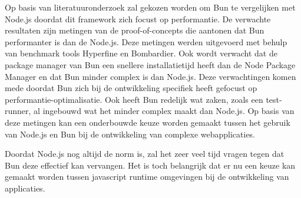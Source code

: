 Op basis van literatuuronderzoek zal gekozen worden om Bun te vergelijken met Node.js doordat dit framework zich focust op performantie.
De verwachte resultaten zijn metingen van de proof-of-concepts die aantonen dat Bun performanter is dan de Node.js. 
Deze metingen werden uitgevoerd met behulp van benchmark tools Hyperfine en Bombardier.
Ook wordt verwacht dat de package manager van Bun een snellere installatietijd heeft dan de Node Package Manager en dat Bun minder complex is dan Node.js.
Deze verwachtingen komen mede doordat Bun zich bij de ontwikkeling specifiek heeft gefocust op performantie-optimalisatie.
Ook heeft Bun redelijk wat zaken, zoals een test-runner, al ingebouwd wat het minder complex maakt dan Node.js.
Op basis van deze metingen kan een onderbouwde keuze worden gemaakt tussen het gebruik van Node.js en Bun bij de ontwikkeling
van complexe webapplicaties.

Doordat Node.js nog altijd de norm is, zal het zeer veel tijd vragen tegen dat Bun deze effectief kan vervangen.
Het is toch belangrijk dat er nu een keuze kan gemaakt worden tussen javascript runtime
omgevingen bij de ontwikkeling van applicaties.


